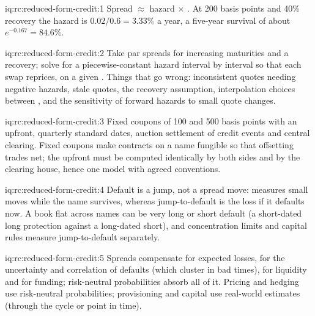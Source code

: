 \begin{solution}{iq:rc:reduced-form-credit:1}
Spread $\approx$ hazard $\times$ . At 200 basis points and 40\% recovery the
hazard is $0.02/0.6 = 3.33\%$ a year, a five-year survival of about $e^{-0.167} = 84.6\%$.
\end{solution}

\begin{solution}{iq:rc:reduced-form-credit:2}
Take par spreads for increasing maturities and a recovery; solve for a piecewise-constant
hazard interval by interval so that each swap reprices, on a given . Things
that go wrong: inconsistent quotes needing negative hazards, stale quotes, the recovery
assumption, interpolation choices between , and the sensitivity of forward hazards
to small quote changes.
\end{solution}

\begin{solution}{iq:rc:reduced-form-credit:3}
Fixed coupons of 100 and 500 basis points with an upfront, quarterly standard dates,
auction settlement of credit events and central clearing. Fixed coupons make contracts on
a name fungible so that offsetting trades net; the upfront must be computed identically by
both sides and by the clearing house, hence one model with agreed conventions.
\end{solution}

\begin{solution}{iq:rc:reduced-form-credit:4}
Default is a jump, not a spread move:  measures small moves while the name survives,
whereas jump-to-default is the loss if it defaults now. A book flat  across names can be
very long or short default (a short-dated long protection against a long-dated short), and
concentration limits and capital rules measure jump-to-default separately.
\end{solution}

\begin{solution}{iq:rc:reduced-form-credit:5}
Spreads compensate for expected losses, for the uncertainty and correlation of defaults
(which cluster in bad times), for liquidity and for funding; risk-neutral probabilities
absorb all of it. Pricing and hedging use risk-neutral probabilities; provisioning and
capital use real-world estimates (through the cycle or point in time).
\end{solution}

